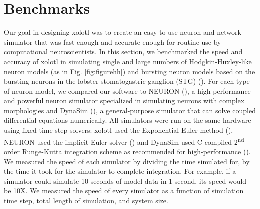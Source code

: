 \documentclass{frontiersSCNS} %
\begin{document}
%
%
%
%
%
%

\section{Benchmarks}
\label{benchmarks}

Our goal in designing xolotl was to create an easy-to-use neuron and network simulator that was fast enough and accurate enough for routine use by computational neuroscientists. In this section, we benchmarked the speed and accuracy of xolotl in simulating single and large numbers of Hodgkin-Huxley-like neuron models (as in Fig. \ref{fig:figurehh}) and bursting neuron models based on the bursting neurons in the lobster stomatogastric ganglion (STG) (\cite{prinzSimilarNetworkActivity2004}). For each type of neuron model, we compared our software to  NEURON (\cite{hinesNEURONSimulationEnvironment1997}), a high-performance and powerful neuron simulator specialized in simulating neurons with complex morphologies and DynaSim (\cite{sherfeyDynaSimMATLABToolbox2018}), a general-purpose simulator that can solve coupled differential equations numerically. All simulators were run on the same hardware using fixed time-step solvers: xolotl used the Exponential Euler method (\cite{dayanTheoreticalNeuroscience2001}), NEURON used the  implicit Euler solver (\cite{hinesNEURONSimulationEnvironment1997}) and DynaSim used C-compiled 2\textsuperscript{nd}-order Runge-Kutta integration scheme as recommended for high-performance (\cite{sherfeyDynaSimMATLABToolbox2018}). We measured the speed of each simulator by dividing the time simulated for, by the time it took for the simulator to complete integration. For example, if a simulator could simulate 10 seconds of model data in 1 second, its speed would be 10X. We measured the speed of every simulator as a function of simulation time step, total length of simulation, and system size.
\end{document}

